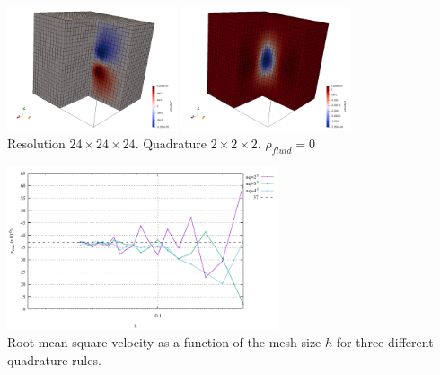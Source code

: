 \begin{center}
\includegraphics[width=5cm]{python_codes/fieldstone_82/results/sphere/v.png}
\includegraphics[width=5cm]{python_codes/fieldstone_82/results/sphere/w.png}\\
{\captionfont Resolution $24\times 24\times 24$. Quadrature $2\times 2 \times 2$. 
$\rho_{fluid}=0$}
\end{center}


\begin{center}
\includegraphics[width=8cm]{python_codes/fieldstone_82/results/sphere/vrms.pdf}\\
{\captionfont Root mean square velocity as a function of the mesh size $h$
for three different quadrature rules.}
\end{center}


